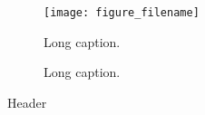 \begin{figure}[htb]
\centering
\texttt{[image: figure\_filename]}
\caption[Short caption]
{Long caption.}
\label{fig:figure_label}
\end{figure}

\begin{figure}[htb]
\centering
{}
\caption[Short caption]
{Long caption.}
\label{fig:missing_figure_label}
\end{figure}

\begin{table}[htb]
\centering
\caption[Short caption.]{Long caption.}
\renewcommand{\arraystretch}{1.2}
\begin{tabular}{}
\toprule
Header \\
\midrule
\content
\bottomrule
\end{tabular}
\label{tab:notation.general}
\end{table}